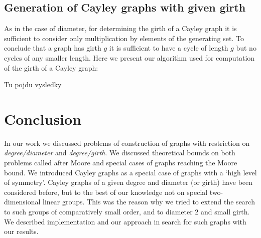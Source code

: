 \documentclass[a4paper,12pt,oneside]{report}%
\begin{document}
\subsection{Generation of Cayley graphs with given girth}

As in the case of diameter, for determining the girth of a Cayley graph it is sufficient to consider only multiplication by elements of the generating set. 
To conclude that a graph has girth $g$ it is sufficient to have a cycle of length $g$ but no cycles of any smaller length. Here we present our algorithm used for computation of  the girth of a Cayley graph:



Tu pojdu vysledky

\newpage

\section{Conclusion}

In our work we discussed problems of construction of graphs with restriction on {\em degree/diameter} and {\em degree/girth}. We discussed theoretical bounds on both problems called after Moore and special cases of graphs reaching the Moore bound. We introduced Cayley graphs as a special case of graphs with a `high level of symmetry'. Cayley graphs of a given degree and diameter (or girth) have been considered before, but to the best of our knowledge not on special two-dimensional linear groups. This was the reason why we tried to extend the search to such groups of comparatively small order, and to diameter 2 and small girth. We described implementation and our approach in search for such graphs with our results.
\end{document}
